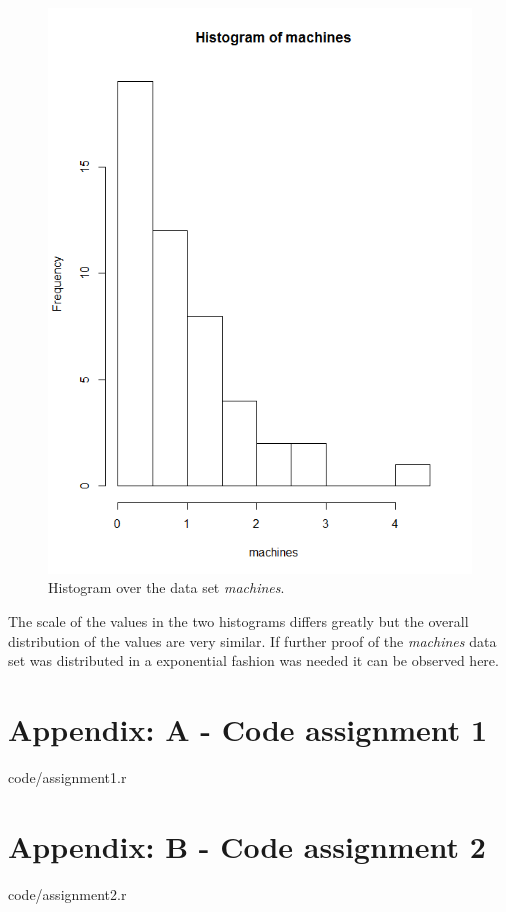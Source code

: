 \documentclass[a4paper,12pt]{article}
\begin{document}
\begin{figure}[H]
\begin{minipage}[]{0.4\textwidth}
  \includegraphics[width=\textwidth]{figures/Lab1_A2_hist_machines.png}  
  \caption{Histogram over the data set \textit{machines}.\label{fig:Histogram over the data set machines} }
 \end{minipage}
\end{figure}
The scale of the values in the two histograms differs greatly but the overall distribution of the values are very similar. If further proof of the \textit{machines} data set was distributed in a exponential fashion was needed it can be observed here.

\section{Appendix: A - Code assignment 1}


    {code/assignment1.r}

\section{Appendix: B - Code assignment 2}


    {code/assignment2.r}
\end{document}
